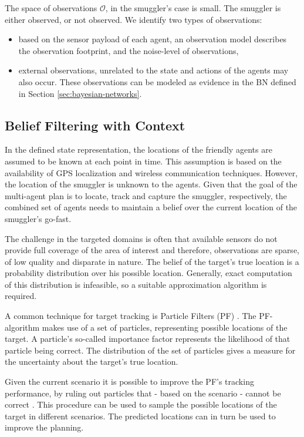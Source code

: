 \documentclass[conference]{IEEEtran}
\begin{document}
The space of observations $\mathcal{O}$, in the smuggler's case is small. The smuggler is either observed, or not observed. We identify two types of observations:
\begin{itemize}
\item based on the sensor payload of each agent, an observation model describes the observation footprint, and the noise-level of observations,
\item external observations, unrelated to the state and actions of the agents may also occur. These observations can be modeled as evidence in the BN defined in Section \ref{sec:bayesian-networks}.
\end{itemize}

\subsection{Belief Filtering with Context}
\label{subsec:belief-filter}

In the defined state representation, the locations of the friendly agents are assumed to be known at each point in time. This assumption is based on the availability of GPS localization and wireless communication techniques. However, the location of the smuggler is unknown to the agents. Given that the goal of the multi-agent plan is to locate, track and capture the smuggler, respectively, the combined set of agents needs to maintain a belief over the current location of the smuggler's go-fast.

The challenge in the targeted domains is often that available sensors do not provide full coverage of the area of interest and therefore, observations are sparse, of low quality and disparate in nature. The belief of the target's true location is a probability distribution over his possible location. Generally, exact computation of this distribution is infeasible, so a suitable approximation algorithm is required.

A common technique for target tracking is Particle Filters (PF) \cite{Blackman1999}. The PF-algorithm makes use of a set of particles, representing possible locations of the target. A particle's so-called importance factor represents the likelihood of that particle being correct. The distribution of the set of particles gives a measure for the uncertainty about the target's true location.

Given the current scenario it is possible to improve the PF's tracking performance, by ruling out particles that - based on the scenario - cannot be correct \cite{deOude2014}. This procedure can be used to sample the possible locations of the target in different scenarios. The predicted locations can in turn be used to improve the planning.
\end{document}
